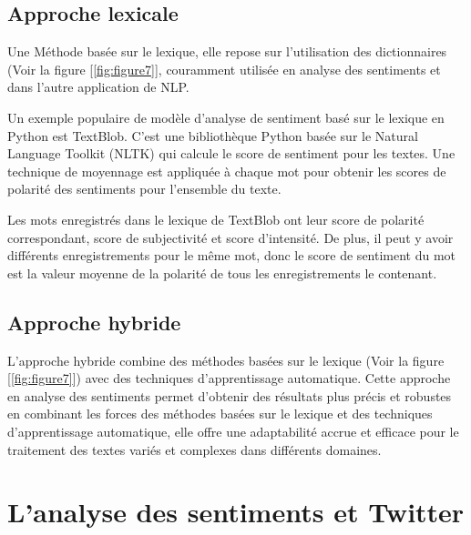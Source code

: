 \subsection{Approche lexicale}
Une Méthode basée sur le lexique, elle repose sur l’utilisation des dictionnaires (Voir la figure [\ref{fig:figure7}], couramment utilisée en analyse des sentiments et dans l’autre application de NLP. \par
Un exemple populaire de modèle d'analyse de sentiment basé sur le lexique en Python est TextBlob. C’est une bibliothèque Python basée sur le Natural Language Toolkit (NLTK) qui calcule le score de sentiment pour les textes. Une technique de moyennage est appliquée à chaque mot pour obtenir les scores de polarité des sentiments pour l'ensemble du texte. \par
Les mots enregistrés dans le lexique de TextBlob ont leur score de polarité correspondant, score de subjectivité et score d'intensité. De plus, il peut y avoir différents enregistrements pour le même mot, donc le score de sentiment du mot est la valeur moyenne de la polarité de tous les enregistrements le contenant.

\subsection{Approche hybride}
L’approche hybride combine des méthodes basées sur le lexique (Voir la figure [\ref{fig:figure7}]) avec des techniques d’apprentissage automatique. Cette approche en analyse des sentiments permet d’obtenir des résultats plus précis et robustes en combinant les forces des méthodes basées sur le lexique et des techniques d’apprentissage automatique, elle offre une adaptabilité accrue et efficace pour le traitement des textes variés et complexes dans différents domaines.


\section{L'analyse des sentiments et Twitter}






